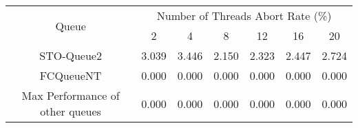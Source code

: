 \begin{tabular}{|c|c|c|c|c|c|c|}
\hline
\multirow{2}{*}{Queue} & \multicolumn{6}{c|}{Number of Threads Abort Rate (\%)}\\\cline{2-7}& 2 & 4 & 8 & 12 & 16 & 20\\
\hline
\hline
STO-Queue2 & 3.039 & 3.446 & 2.150 & 2.323 & 2.447 & 2.724\\
FCQueueNT & 0.000 & 0.000 & 0.000 & 0.000 & 0.000 & 0.000\\
Max Performance of other queues & 0.000 & 0.000 & 0.000 & 0.000 & 0.000 & 0.000\\
\hline\end{tabular}

